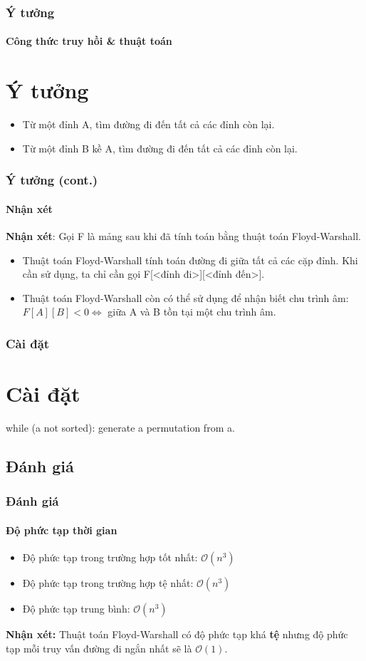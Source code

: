 \documentclass[12pt]{beamer}
\begin{document}
    \begin{frame}[t]
        \frametitle{Ý tưởng}
        \framesubtitle{Công thức truy hồi \& thuật toán}
        \section{Ý tưởng}
        \begin{itemize}
            \item Từ một đỉnh A, tìm đường đi đến tất cả các đỉnh còn lại.
            \item Từ một đỉnh B kề A, tìm đường đi đến tất cả các đỉnh còn lại.
        \end{itemize}

    \end{frame}

    \begin{frame}
        \frametitle{Ý tưởng (cont.)}
        \framesubtitle{Nhận xét}
        \textbf{Nhận xét}: Gọi F là mảng sau khi đã tính toán bằng thuật toán Floyd-Warshall.\pause
        \begin{itemize}
            \item Thuật toán Floyd-Warshall tính toán đường đi giữa tất cả các cặp đỉnh. Khi cần sử dụng, ta chỉ cần gọi F[<đỉnh đi>][<đỉnh đến>].\pause
            \item Thuật toán Floyd-Warshall còn có thể sử dụng để nhận biết chu trình âm: $F[A][B] < 0 \iff $ giữa A và B tồn tại một chu trình âm.
        \end{itemize}
    \end{frame}

    \begin{frame}[t]
        \frametitle{Cài đặt}
        \section{Cài đặt}
        while (a not sorted):
            generate a permutation from a.
    \end{frame}

    \begin{frame}[t]
        \section{Đánh giá}
        \frametitle{Đánh giá}
        \framesubtitle{Độ phức tạp thời gian}
        \begin{itemize}
            \item Độ phức tạp trong trường hợp tốt nhất: $\mathcal{O}(n^3)$
            \item Độ phức tạp trong trường hợp tệ nhất: $\mathcal{O}(n^3)$
            \item Độ phức tạp trung bình: $\mathcal{O}(n^3)$
        \end{itemize}
        \textbf{Nhận xét:} Thuật toán Floyd-Warshall có độ phức tạp khá \textbf{tệ} nhưng độ phức tạp mỗi truy vấn đường đi ngắn nhất sẽ là $\mathcal{O}(1)$.
    \end{frame}
\end{document}
